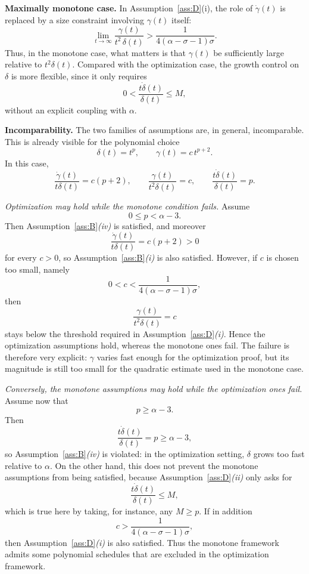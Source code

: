 \documentclass[11pt]{article}
\numberwithin{equation}{section}
\begin{document}
\smallskip
\noindent
\textbf{Maximally monotone case.}
In Assumption~\ref{ass:D}(i), the role of $\dot\gamma(t)$ is replaced by a {size constraint} involving $\gamma(t)$ itself:
\[
\lim_{t\to\infty}\frac{\gamma(t)}{t^2\,\delta(t)}>\frac{1}{4(\alpha-\sigma-1)\sigma}.
\]
Thus, in the monotone case, what matters is that $\gamma(t)$ be sufficiently large relative to
$t^2\delta(t)$.
Compared with the optimization case, the growth control on $\delta$ is more flexible, since it only requires
\[
0<\frac{t\dot\delta(t)}{\delta(t)}\le M,
\]
without an explicit coupling with $\alpha$.

\smallskip
\noindent
\textbf{Incomparability.}
The two families of assumptions are, in general, incomparable. This is already visible for the polynomial
choice
\[
\delta(t)=t^p,\qquad \gamma(t)=c\,t^{p+2}.
\]
In this case,
\[
\frac{\dot\gamma(t)}{t\delta(t)}=c(p+2),\qquad
\frac{\gamma(t)}{t^2\delta(t)}=c,\qquad
\frac{t\dot\delta(t)}{\delta(t)}=p.
\]

\textit{Optimization may hold while the monotone condition fails.}
Assume
\[
0\le p<\alpha-3.
\]
Then Assumption~\ref{ass:B}\textit{(iv)} is satisfied, and moreover
\[
\frac{\dot\gamma(t)}{t\delta(t)}=c(p+2)>0
\]
for every $c>0$, so Assumption~\ref{ass:B}\textit{(i)} is also satisfied. However, if $c$ is chosen too small,
namely
\[
0<c<\frac{1}{4(\alpha-\sigma-1)\sigma},
\]
then
\[
\frac{\gamma(t)}{t^2\delta(t)}=c
\]
stays below the threshold required in Assumption~\ref{ass:D}\textit{(i)}. Hence the optimization
assumptions hold, whereas the monotone ones fail. The failure is therefore very explicit: $\gamma$
varies fast enough for the optimization proof, but its {magnitude} is still too small for the quadratic
estimate used in the monotone case.

\medskip
\noindent
\textit{Conversely, the monotone assumptions may hold while the optimization ones fail.}
Assume now that
\[
p\geq\alpha-3.
\]
Then
\[
\frac{t\dot\delta(t)}{\delta(t)}=p\geq\alpha-3,
\]
so Assumption~\ref{ass:B}\textit{(iv)} is violated: in the optimization setting, $\delta$ grows too fast relative
to $\alpha$. On the other hand, this does not prevent the monotone assumptions from being satisfied,
because Assumption~\ref{ass:D}\textit{(ii)} only asks for
\[
\frac{t\dot\delta(t)}{\delta(t)}\le M,
\]
which is true here by taking, for instance, any $M\ge p$. If in addition
\[
c>\frac{1}{4(\alpha-\sigma-1)\sigma},
\]
then Assumption~\ref{ass:D}\textit{(i)} is also satisfied. Thus the monotone framework admits some
polynomial schedules that are excluded in the optimization framework.
\end{document}
